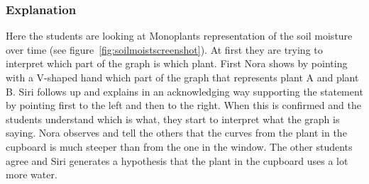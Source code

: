 \subsubsection*{Explanation}
Here the students are looking at Monoplants representation of the soil moisture over time (see figure~\ref{fig:soilmoistscreenshot}). At first they are trying to interpret which part of the graph is which plant. First Nora shows by pointing with a V-shaped hand which part of the graph that represents plant A and plant B. Siri follows up and explains in an acknowledging way supporting the statement by pointing first to the left and then to the right. When this is confirmed and the students understand which is what, they start to interpret what the graph is saying. Nora observes and tell the others that the curves from the plant in the cupboard is much steeper than from the one in the window. The other students agree and Siri generates a hypothesis that the plant in the cupboard uses a lot more water.